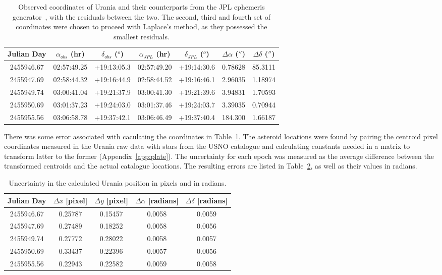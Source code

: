 \documentclass[a4paper,12pt]{article}
\begin{document}
\begin{table}[!htbp]
  \centering
  \begin{tabular}{|c||c||c||c||c||c||c|}
  \hline
   Julian Day & $\alpha_{obs}$ (hr) & $\delta_{obs}$ ($^o$) & $\alpha_{JPL}$ (hr) & $\delta_{JPL}$ ($^o$) & $\Delta\alpha$ ($''$) & $\Delta\delta$ ($''$)\\
   \hline
   \hline
   2455946.67 & 02:57:49.25 & +19:13:05.3 & 02:57:49.20 & +19:14:30.6 & 0.78628 & 85.3111\\
   \hline
   2455947.69 & 02:58:44.32 & +19:16:44.9 & 02:58:44.52 & +19:16:46.1 & 2.96035 & 1.18974\\
   \hline
   2455949.74 & 03:00:41.04 & +19:21:37.9 & 03:00:41.30 & +19:21:39.6 & 3.94831 & 1.70593\\
   \hline
   2455950.69 & 03:01:37.23 & +19:24:03.0 & 03:01:37.46 & +19:24:03.7 & 3.39035 & 0.70944\\
   \hline
   2455955.56 & 03:06:58.78 & +19:37:42.1 & 03:06:46.49 & +19:37:40.4 & 184.300 & 1.66187\\
   \hline
   \end{tabular}
    \caption{Observed coordinates of Urania and their counterparts from the JPL ephemeris generator~\citep{urania}, with the residuals between the two. The second, third and fourth set of coordinates were chosen to proceed with Laplace's method, as they possessed the smallest residuals.}
    \label{tab:coords}
\end{table}

There was some error associated with caculating the coordinates in Table~\ref{tab:coords}. The asteroid locations were found by pairing the centroid pixel coordinates measured in the Urania raw data with stars from the USNO catalogue and calculating constants needed in a matrix to transform latter to the former (Appendix~\ref{app:plate}). The uncertainty for each epoch was measured as the average difference between the transformed centroids and the actual catalogue locations. The resulting errors are listed in Table~\ref{tab:pixresid}, as well as their values in radians.

\begin{table}[!htbp]
  \centering
  \begin{tabular}{|c||c||c||c||c|}
  \hline
   Julian Day & $\Delta x$ [pixel] & $\Delta y$ [pixel] & $\Delta\alpha$ [radians] & $\Delta\delta$ [radians]\\
   \hline
   \hline
   2455946.67 & 0.25787 & 0.15457 & 0.0058 & 0.0059\\
   \hline
   2455947.69 & 0.27489 & 0.18252 & 0.0058 & 0.0056\\
   \hline
   2455949.74 & 0.27772 & 0.28022 & 0.0058 & 0.0057\\
   \hline
   2455950.69 & 0.33437 & 0.22396 & 0.0057 & 0.0056\\
   \hline
   2455955.56 & 0.22943 & 0.22582 & 0.0059 & 0.0058\\
   \hline
   \end{tabular}
    \caption{Uncertainty in the calculated Urania position in pixels and in radians.}
    \label{tab:pixresid}
\end{table}
\end{document}
